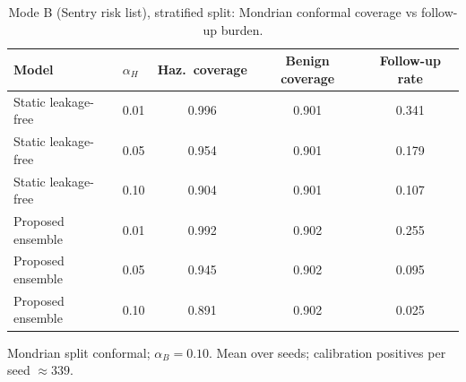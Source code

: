 \begin{table}[t]
\centering
\small
\caption{Mode B (Sentry risk list), stratified split: Mondrian conformal coverage vs follow-up burden.}
\label{tab:conf_sentry_stratified}
\begin{tabular}{llccc}
\toprule
Model & $\alpha_H$ & Haz.\ coverage & Benign coverage & Follow-up rate \\
\midrule
Static leakage-free & 0.01 & 0.996 & 0.901 & 0.341 \\
Static leakage-free & 0.05 & 0.954 & 0.901 & 0.179 \\
Static leakage-free & 0.10 & 0.904 & 0.901 & 0.107 \\
\midrule
Proposed ensemble & 0.01 & 0.992 & 0.902 & 0.255 \\
Proposed ensemble & 0.05 & 0.945 & 0.902 & 0.095 \\
Proposed ensemble & 0.10 & 0.891 & 0.902 & 0.025 \\
\bottomrule
\end{tabular}
\par\vspace{2pt}\footnotesize Mondrian split conformal; $\alpha_B=0.10$. Mean over seeds; calibration positives per seed $\approx 339$.
\end{table}
